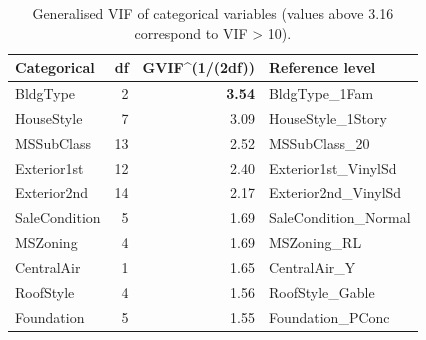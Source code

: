 \begin{table}[t]
\centering
\small
\begin{tabular}{lrrl}
\toprule
Categorical & df & GVIF\^{}(1/(2df)) & Reference level \\
\midrule
BldgType & 2 & \textbf{3.54} & BldgType\_1Fam \\
HouseStyle & 7 & 3.09 & HouseStyle\_1Story \\
MSSubClass & 13 & 2.52 & MSSubClass\_20 \\
Exterior1st & 12 & 2.40 & Exterior1st\_VinylSd \\
Exterior2nd & 14 & 2.17 & Exterior2nd\_VinylSd \\
SaleCondition & 5 & 1.69 & SaleCondition\_Normal \\
MSZoning & 4 & 1.69 & MSZoning\_RL \\
CentralAir & 1 & 1.65 & CentralAir\_Y \\
RoofStyle & 4 & 1.56 & RoofStyle\_Gable \\
Foundation & 5 & 1.55 & Foundation\_PConc \\
\bottomrule
\end{tabular}
\caption{Generalised VIF of categorical variables (values above 3.16 correspond to VIF > 10).}
\label{tab:gvif}
\end{table}
